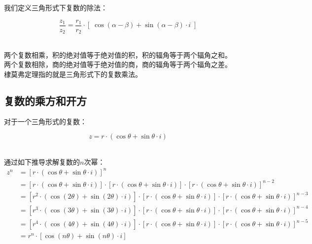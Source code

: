 \documentclass[UTF8]{ctexart}
\begin{document}
    我们定义三角形式下复数的除法：\vspace{3pt}
    \begin{large}
        \begin{equation*}
            \frac{z_1}{z_2}=\frac{r_1}{r_2}\cdot\left[\;\cos{(\alpha-\beta)}+\sin{(\alpha-\beta)}\cdot i\;\right]
        \end{equation*}
    \end{large}\\
    两个复数相乘，积的绝对值等于绝对值的积，积的辐角等于两个辐角之和。\\[2mm]
    两个复数相除，商的绝对值等于绝对值的商，商的辐角等于两个辐角之差。\\[3mm]
    棣莫弗定理指的就是三角形式下的复数乘法。

\newpage

\subsection{复数的乘方和开方}
    对于一个三角形式的复数：
    \begin{large}
        \begin{equation*}
            z=r\cdot(\cos{\theta}+\sin{\theta}\cdot i)
        \end{equation*}
    \end{large}\\
    通过如下推导求解复数的$n$次幂：
    \setcounter{equation}{0}
    \begin{align}
        z^n&=\left[r\cdot(\cos{\theta}+\sin{\theta}\cdot i)\right]^n\\[3mm]
        &=\left[r\cdot(\cos{\theta}+\sin{\theta}\cdot i)\right]\cdot\left[r\cdot(\cos{\theta}+\sin{\theta}\cdot i)\right]\cdot\left[r\cdot(\cos{\theta}+\sin{\theta}\cdot i)\right]^{n-2}\\[3mm]
        &=\left[r^2\cdot(\cos{(2\theta)}+\sin{(2\theta)}\cdot i)\right]\cdot\left[r\cdot(\cos{\theta}+\sin{\theta}\cdot i)\right]\cdot\left[r\cdot(\cos{\theta}+\sin{\theta}\cdot i)\right]^{n-3}\\[3mm]
        &=\left[r^3\cdot(\cos{(3\theta)}+\sin{(3\theta)}\cdot i)\right]\cdot\left[r\cdot(\cos{\theta}+\sin{\theta}\cdot i)\right]\cdot\left[r\cdot(\cos{\theta}+\sin{\theta}\cdot i)\right]^{n-4}\\[3mm]
        &=\left[r^4\cdot(\cos{(4\theta)}+\sin{(4\theta)}\cdot i)\right]\cdot\left[r\cdot(\cos{\theta}+\sin{\theta}\cdot i)\right]\cdot\left[r\cdot(\cos{\theta}+\sin{\theta}\cdot i)\right]^{n-5}\\[3mm]
        &=r^n\cdot[\cos{(n\theta)}+\sin{(n\theta)}\cdot i]
    \end{align}\\
\end{document}
